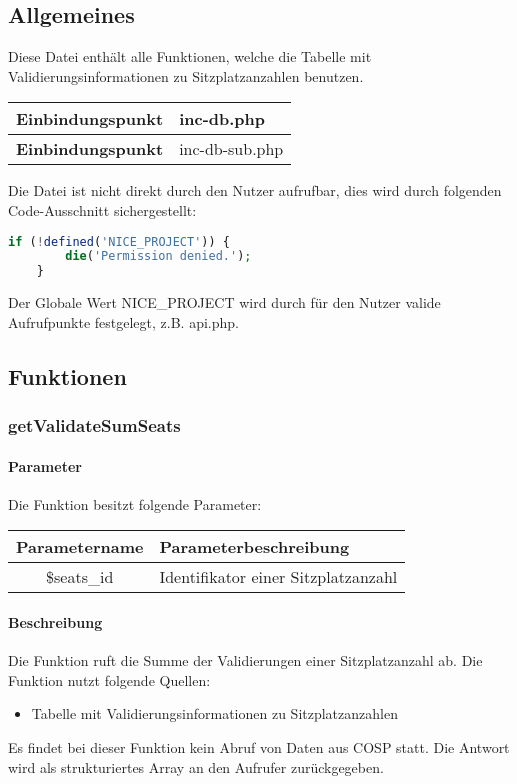 \subsection{Allgemeines} Diese Datei enthält alle Funktionen, welche die Tabelle mit Validierungsinformationen zu Sitzplatzanzahlen benutzen.
\begin{table}[H]
	\begin{tabular}{|c|p{11cm}|}
		\hline
		\textbf{Einbindungspunkt} & inc-db.php \\ \hline
		\textbf{Einbindungspunkt} & inc-db-sub.php \\ \hline
	\end{tabular}
\end{table}
Die Datei ist nicht direkt durch den Nutzer aufrufbar, dies wird durch folgenden Code-Ausschnitt sichergestellt:
\begin{lstlisting}[language=php]
	if (!defined('NICE_PROJECT')) {
		die('Permission denied.');
	}
\end{lstlisting}
Der Globale Wert {\glqq NICE\_PROJECT\grqq} wird durch für den Nutzer valide Aufrufpunkte festgelegt, z.B. {\glqq api.php\grqq}.
\newpage
\subsection{Funktionen}
\subsubsection{getValidateSumSeats}
\paragraph{Parameter} Die Funktion besitzt folgende Parameter:
\begin{table}[H]
	\begin{tabular}{|c|p{11cm}|}
		\hline
		\textbf{Parametername} & \textbf{Parameterbeschreibung} \\ \hline
		\$seats\_id & Identifikator einer Sitzplatzanzahl \\ \hline
	\end{tabular}
\end{table}
\paragraph{Beschreibung} Die Funktion ruft die Summe der Validierungen einer Sitzplatzanzahl ab. Die Funktion nutzt folgende Quellen:
\begin{itemize}
	\item Tabelle mit Validierungsinformationen zu Sitzplatzanzahlen
\end{itemize}
Es findet bei dieser Funktion kein Abruf von Daten aus {\glqq COSP\grqq} statt. Die Antwort wird als strukturiertes Array an den Aufrufer zurückgegeben.
